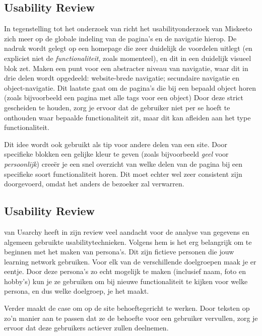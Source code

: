 \documentclass[a4paper, 10pt, pdftex]{report}
\begin{document}
    \subsection{Usability Review \citet{Hoekman2008}}
    In tegenstelling tot het onderzoek van \citeauthor{Alfrink2008} richt het usabilityonderzoek van Miskeeto zich meer op de globale indeling van de pagina's en de navigatie hierop. De nadruk wordt gelegt op een homepage die zeer duidelijk de voordelen uitlegt (en expliciet niet de \emph{functionaliteit}, zoals momenteel), en dit in een duidelijk visueel blok zet. \citeauthor{Hoekman2008} Maken een punt voor een abstracter niveau van navigatie, waar dit in drie delen wordt opgedeeld: website-brede navigatie; secundaire navigatie en object-navigatie. Dit laatste gaat om de pagina's die bij een bepaald object horen (zoals bijvoorbeeld een pagina met alle tags voor een object) Door deze strict gescheiden te houden, zorg je ervoor dat de gebruiker niet per se hoeft te onthouden waar bepaalde functionaliteit zit, maar dit kan afleiden aan het type functionaliteit.

    Dit idee wordt ook gebruikt als tip voor andere delen van een site. Door specifieke blokken een gelijke kleur te geven (zoals bijvoorbeeld \emph{geel} voor \emph{persoonlijk}) cree\"er je een snel overzicht van welke delen van de pagina bij een specifieke soort functionaliteit horen. Dit moet echter wel zeer consistent zijn doorgevoerd, omdat het anders de bezoeker zal verwarren.

    \subsection{Usability Review \citet{Timmerman2008}}
    \citeauthor{Timmerman2008} van Usarchy heeft in zijn review veel aandacht voor de analyse van gegevens en algemeen gebruikte usabilitytechnieken. Volgens hem is het erg belangrijk om te beginnen met het maken van persona's. Dit zijn fictieve personen die jouw learning network gebruiken. Voor elk van de verschillende doelgroepen maak je er eentje. Door deze persona's zo echt mogelijk te maken (inclusief naam, foto en hobby's) kun je ze gebruiken om bij nieuwe functionaliteit te kijken voor welke persona, en dus welke doelgroep, je het maakt.

    Verder maakt \citeauthor{Timmerman2008} de case om op de site behoeftegericht te werken. Door teksten op zo'n manier aan te passen dat ze de behoefte voor een gebruiker vervullen, zorg je ervoor dat deze gebruikers actiever zullen deelnemen.
\end{document}
